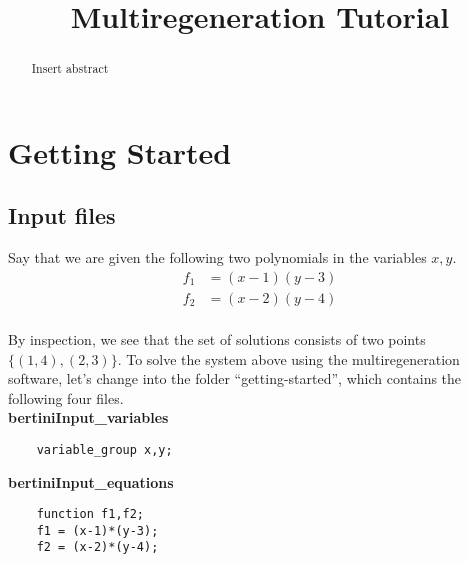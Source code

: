 \documentclass[12pt]{article}
\title{\large \bf
Multiregeneration Tutorial
}
\author{}
\theoremstyle{definition}
\newcommand{\C}{\mathbb{C}}
\newcommand{\red}[1]{{\color{red}#1}}
\begin{document}
\maketitle
\begin{abstract} 
\red{Insert abstract}
\end{abstract}

\section{Getting Started}
\subsection{Input files}
Say that we are given the following two polynomials
in the variables $x,y$. 
\begin{align*}
    f_1 &= (x-1)(y-3)\\
    f_2 &= (x-2)(y-4)\\
\end{align*}

\noindent 
By inspection, we see that the set of solutions consists of two points $\{ (1,4), (2,3)\}$.
To solve the system above using the multiregeneration software, let's change into the folder 
``getting-started'', which contains the following four files.\\

\noindent \textbf{bertiniInput\_variables}


\begin{leftbar}
\vspace{-10pt} 
\begin{verbatim}
    variable_group x,y; 
\end{verbatim}\vspace{-10pt} 
\end{leftbar}

\noindent \textbf{bertiniInput\_equations}


\begin{leftbar}
\vspace{-10pt} 
\begin{verbatim}
    function f1,f2;
    f1 = (x-1)*(y-3);
    f2 = (x-2)*(y-4);
\end{verbatim}\vspace{-10pt} 
\end{leftbar}
\end{document}
